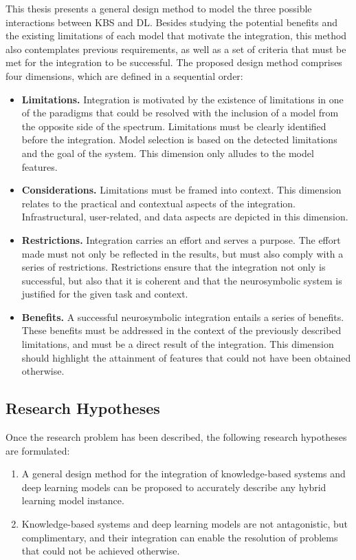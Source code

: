 This thesis presents a general design method to model the three possible interactions between KBS and DL. Besides studying the potential benefits and the existing limitations of each model that motivate the integration, this method also contemplates previous requirements, as well as a set of criteria that must be met for the integration to be successful. The proposed design method comprises four dimensions, which are defined in a sequential order:
\begin{itemize}
    \item \textbf{Limitations.} Integration is motivated by the existence of limitations in one of the paradigms that could be resolved with the inclusion of a model from the opposite side of the spectrum. Limitations must be clearly identified before the integration. Model selection is based on the detected limitations and the goal of the system. This dimension only alludes to the model features.
    
    \item \textbf{Considerations.} Limitations must be framed into context. This dimension relates to the practical and contextual aspects of the integration. Infrastructural, user-related, and data aspects are depicted in this dimension.
    
    \item \textbf{Restrictions.} Integration carries an effort and serves a purpose. The effort made must not only be reflected in the results, but must also comply with a series of restrictions. Restrictions ensure that the integration not only is successful, but also that it is coherent and that the neurosymbolic system is justified for the given task and context.
    
    \item \textbf{Benefits.} A successful neurosymbolic integration entails a series of benefits. These benefits must be addressed in the context of the previously described limitations, and must be a direct result of the integration. This dimension should highlight the attainment of features that could not have been obtained otherwise.
\end{itemize}

\subsection{Research Hypotheses}
Once the research problem has been described, the following research hypotheses are formulated:
\begin{enumerate} [start=1,label={\bfseries H\arabic*:}]
    \item A general design method for the integration of knowledge-based systems and deep learning models can be proposed to accurately describe any hybrid learning model instance. 
    \item Knowledge-based systems and deep learning models are not antagonistic, but complimentary, and their integration can enable the resolution of problems that could not be achieved otherwise.
\end{enumerate}

